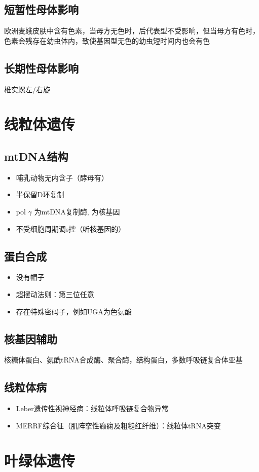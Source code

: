 \documentclass[a4paper, 12pt]{report}
\begin{document}
\subsection{短暂性母体影响}
欧洲麦蛾皮肤中含有色素，当母方无色时，后代表型不受影响，但当母方有色时，色素会残存在幼虫体内，致使基因型无色的幼虫短时间内也会有色
\subsection{长期性母体影响}
椎实螺左/右旋
\section{线粒体遗传}
\subsection{mtDNA结构}
\begin{itemize}
    \item 哺乳动物无内含子（酵母有）
    \item 半保留D环复制
    \item pol \(\gamma\) 为mtDNA复制酶, 为核基因
    \item 不受细胞周期调s控（听核基因的）
\end{itemize}
\subsection{蛋白合成}
\begin{itemize}
    \item 没有帽子
    \item 超摆动法则：第三位任意
    \item 存在特殊密码子，例如UGA为色氨酸
\end{itemize}
\subsection{核基因辅助}
核糖体蛋白、氨酰tRNA合成酶、聚合酶，结构蛋白，多数呼吸链复合体亚基
\subsection{线粒体病}
\begin{itemize}
    \item Leber遗传性视神经病：线粒体呼吸链复合物异常
    \item MERRF综合征（肌阵挛性癫痫及粗糙红纤维）：线粒体tRNA突变
\end{itemize}
\section{叶绿体遗传}
\end{document}
